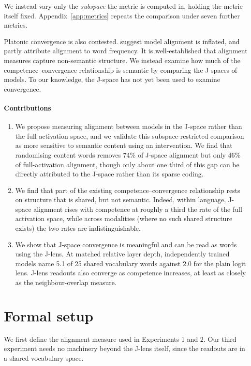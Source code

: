\documentclass{article}
\begin{document}
We instead vary only the \emph{subspace} the metric is computed in, holding the metric itself fixed. Appendix~\ref{app:metrics} repeats the comparison under seven further metrics. 

Platonic convergence is also contested. \citet{groger2026revisiting} suggest model alignment is inflated, and \citet{bangachev2026representationalignmentrestslinear} partly attribute alignment to word frequency. It is well-established that alignment measures capture non-semantic structure. We instead examine how much of the competence--convergence relationship is semantic by comparing the J-spaces of models. To our knowledge, the J-space has not yet been used to examine convergence.
\paragraph{Contributions} 
\begin{enumerate}
\item We propose measuring alignment between models in the J-space rather than the full activation space, and we validate this subspace-restricted comparison as more sensitive to semantic content using an intervention. We find that randomising content words removes 74\% of J-space alignment but only 46\% of full-activation alignment, though only about one third of this gap can be directly attributed to the J-space rather than its sparse coding.
\item We find that part of the existing competence--convergence relationship rests on structure that is shared, but not semantic. Indeed, within language, J-space alignment rises with competence at roughly a third the rate of the full activation space, while across modalities (where no such shared structure exists) the two rates are indistinguishable. 
\item We show that J-space convergence is meaningful and can be read as words using the J-lens. At matched relative layer depth, independently trained models name 5.1 of 25 shared vocabulary words against 2.0 for the plain logit lens. J-lens readouts also converge as competence increases, at least as closely as the neighbour-overlap measure.
\end{enumerate}

\section{Formal setup}
\label{sec:formal}
We first define the alignment measure used in Experiments 1 and 2. Our third experiment needs no machinery beyond the J-lens itself, since the readouts are in a shared vocabulary space.
\end{document}
